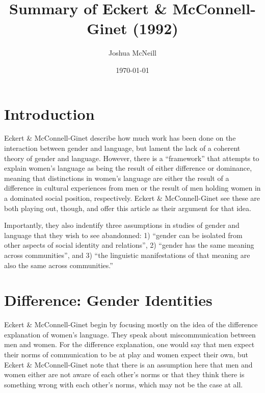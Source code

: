 \documentclass{article}
\title{Summary of Eckert \& McConnell-Ginet (1992)}
\author{Joshua McNeill}
\date{\today}
\begin{document}
  \maketitle
  \section{Introduction}
    Eckert \& McConnell-Ginet describe how much work has been done on the interaction between gender and language, but lament the lack of a coherent theory of gender and language.
    However, there is a ``framework'' that attempts to explain women's language as being the result of either difference or dominance, meaning that distinctions in women's language are either the result of a difference in cultural experiences from men or the result of men holding women in a dominated social position, respectively.
    Eckert \& McConnell-Ginet see these are both playing out, though, and offer this article as their argument for that idea.

    Importantly, they also indentify three assumptions in studies of gender and language that they wish to see abandonned: 1) ``gender can be isolated from other aspects of social identity and relations'', 2) ``gender has the same meaning across communities'', and 3) ``the linguistic manifestations of that meaning are also the same across communities.''

  \section{Difference: Gender Identities}
    Eckert \& McConnell-Ginet begin by focusing mostly on the idea of the difference explanation of women's language.
    They speak about miscommunication between men and women.
    For the difference explanation, one would say that men expect their norms of communication to be at play and women expect their own, but Eckert \& McConnell-Ginet note that there is an assumption here that men and women either are not aware of each other's norms or that they think there is something wrong with each other's norms, which may not be the case at all.
\end{document}
